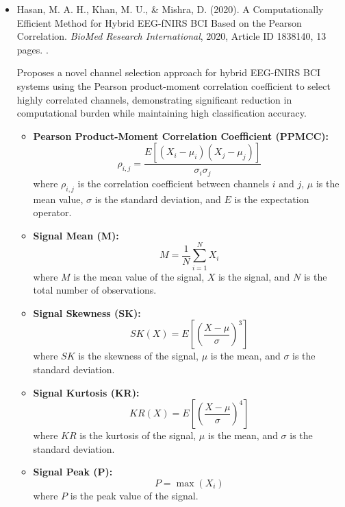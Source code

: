 \documentclass[10pt,svgnames,fragile]{beamer}
\begin{document}
\begin{frame}
\tiny
\begin{itemize}

    \item Hasan, M. A. H., Khan, M. U., \& Mishra, D. (2020). A Computationally Efficient Method for Hybrid EEG-fNIRS BCI Based on the Pearson Correlation. \textit{BioMed Research International}, 2020, Article ID 1838140, 13 pages. \href{https://doi.org/10.1155/2020/1838140}{\color{blue}{DOI: 10.1155/2020/1838140}}. \cite{hasanComputationallyEfficientMethod2020}

    {\color{gray}Proposes a novel channel selection approach for hybrid EEG-fNIRS BCI systems using the Pearson product-moment correlation coefficient to select highly correlated channels, demonstrating significant reduction in computational burden while maintaining high classification accuracy.}
    \begin{itemize} \tiny
    \item \textbf{Pearson Product-Moment Correlation Coefficient (PPMCC):}
    \[
    \rho_{i,j} = \frac{E[(X_i - \mu_i)(X_j - \mu_j)]}{\sigma_i \sigma_j}
    \]
    where \( \rho_{i,j} \) is the correlation coefficient between channels \( i \) and \( j \), \( \mu \) is the mean value, \( \sigma \) is the standard deviation, and \( E \) is the expectation operator.

    \item \textbf{Signal Mean (M):}
    \[
    M = \frac{1}{N} \sum_{i=1}^{N} X_i
    \]
    where \( M \) is the mean value of the signal, \( X \) is the signal, and \( N \) is the total number of observations.

    \item \textbf{Signal Skewness (SK):}
    \[
    SK(X) = E\left[\left(\frac{X - \mu}{\sigma}\right)^3\right]
    \]
    where \( SK \) is the skewness of the signal, \( \mu \) is the mean, and \( \sigma \) is the standard deviation.

    \item \textbf{Signal Kurtosis (KR):}
    \[
    KR(X) = E\left[\left(\frac{X - \mu}{\sigma}\right)^4\right]
    \]
    where \( KR \) is the kurtosis of the signal, \( \mu \) is the mean, and \( \sigma \) is the standard deviation.

    \item \textbf{Signal Peak (P):}
    \[
    P = \max(X_i)
    \]
    where \( P \) is the peak value of the signal.
    \end{itemize}
    
\end{itemize}
\end{frame}
\end{document}
